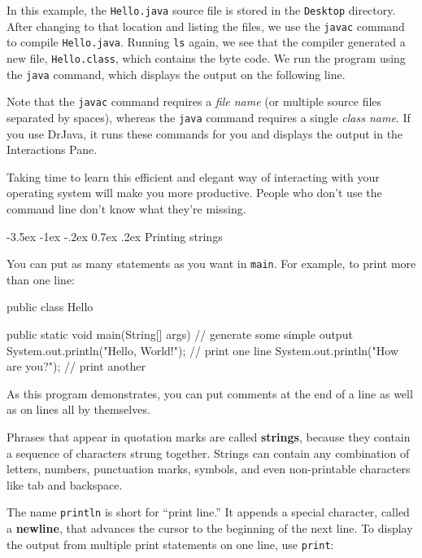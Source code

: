 \documentclass[12pt]{book}
\makeatletter
\theoremstyle{exercise}
\newcommand{\java}[1]{\verb"#1"}
\renewcommand{\section}{\@startsection {section}{1}{\z@}%
    {-3.5ex \@plus -1ex \@minus -.2ex}%
    {0.7ex \@plus.2ex}%
    {\normalfont\Large\bfseries}}
\newcommand{\java}[1]{\lstinline{#1}} %
\makeatother
\begin{document}
In this example, the {\tt Hello.java} source file is stored in the {\tt Desktop} directory.
After changing to that location and listing the files, we use the {\tt javac} command to compile {\tt Hello.java}.
Running {\tt ls} again, we see that the compiler generated a new file, {\tt Hello.class}, which contains the byte code.
We run the program using the {\tt java} command, which displays the output on the following line.

Note that the {\tt javac} command requires a {\em file name} (or multiple source files separated by spaces), whereas the {\tt java} command requires a single {\em class name}.
If you use DrJava, it runs these commands for you and displays the output in the Interactions Pane.

Taking time to learn this efficient and elegant way of interacting with your operating system will make you more productive.
People who don't use the command line don't know what they're missing.



\section{Printing strings}

You can put as many statements as you want in \java{main}.
For example, to print more than one line:

\begin{code}
public class Hello {

    public static void main(String[] args) {
        // generate some simple output
        System.out.println("Hello, World!");  // print one line
        System.out.println("How are you?");   // print another
    }

}
\end{code}

As this program demonstrates, you can put comments at the end of a line as well as on lines all by themselves.


Phrases that appear in quotation marks are called {\bf strings}, because they contain a sequence of characters strung together.
Strings can contain any combination of letters, numbers, punctuation marks, symbols, and even non-printable characters like tab and backspace.


The name \java{println} is short for ``print line.''
It appends a special character, called a {\bf newline}, that advances the cursor to the beginning of the next line.
To display the output from multiple print statements on one line, use \java{print}:
\end{document}
